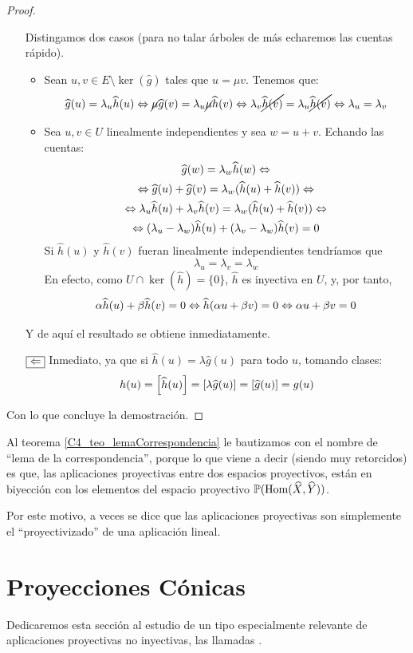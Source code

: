 \begin{proof}
\begin{itemize}
		Distingamos dos casos (para no talar árboles de más echaremos las cuentas rápido).
		\begin{itemize}
			\item Sean $u,v\in E\setminus\ker(\widehat{g})$ tales que $u=\mu v$. Tenemos que:
			\[
			\widehat{g}(u)=\lambda_u\widehat{h}(u)
			\Leftrightarrow\cancel{\mu}\widehat{g}(v)=\lambda_u\cancel{\mu}\widehat{h}(v)\Leftrightarrow\lambda_v\cancel{\widehat{h}(v)}=\lambda_u\cancel{\widehat{h}(v)}\Leftrightarrow\lambda_u=\lambda_v
			\]
			\item Sea $u,v\in U$ linealmente independientes y sea $w=u+v$. Echando las cuentas:
			\begin{multline}\widehat{g}(w)=\lambda_w\widehat{h}(w)\Leftrightarrow\\\Leftrightarrow\widehat{g}(u)+\widehat{g}(v)=\lambda_w(\widehat{h}(u)+\widehat{h}(v))\Leftrightarrow\\
			\Leftrightarrow \lambda_u\widehat{h}(u)+\lambda_v\widehat{h}(v)=\lambda_w(\widehat{h}(u)+\widehat{h}(v))\Leftrightarrow\\
			\Leftrightarrow(\lambda_u-\lambda_w)\widehat{h}(u)+(\lambda_v-\lambda_w)\widehat{h}(v)=0\end{multline}
			Si $\widehat{h}(u)$ y $\widehat{h}(v)$ fueran linealmente independientes tendríamos que \[\lambda_u=\lambda_v=\lambda_w\]
			En efecto, como $U\cap\ker(\widehat{h})=\{0\}$, $\widehat{h}$ es inyectiva en $U$, y, por tanto,
			\[\alpha\widehat{h}(u)+\beta\widehat{h}(v)=0\Leftrightarrow \widehat{h}(\alpha u +\beta v)=0\Leftrightarrow \alpha u +\beta v=0\]
		\end{itemize}
		Y de aquí el resultado se obtiene inmediatamente.
		\item[$\fbox{$\Leftarrow$}$] Inmediato, ya que si $\widehat{h}(u)=\lambda\widehat{g}(u)$ para todo $u$, tomando clases:
		\[h(u)=\left [ \widehat{h}(u) \right ]=\left [ \lambda\widehat{g}(u) \right ]=\left [ \widehat{g}(u) \right ]=g(u)\]
	\end{itemize}
	Con lo que concluye la demostración.
\end{proof}
Al teorema \ref{C4_teo_lemaCorrespondencia} le bautizamos con el nombre de ``lema de la correspondencia'', porque lo que viene a decir (siendo muy retorcidos) es que, las aplicaciones proyectivas entre dos espacios proyectivos, están en biyección con los elementos del espacio proyectivo $\mathbb{P}(\mathrm{Hom}(\widehat{X},\widehat{Y}))$.

Por este motivo, a veces se dice que las aplicaciones proyectivas son simplemente el ``proyectivizado'' de una aplicación lineal.
\section{Proyecciones Cónicas}
\label{C4_proyeccionesConicas}
Dedicaremos esta sección al estudio de un tipo especialmente relevante de aplicaciones proyectivas no inyectivas, las llamadas .

